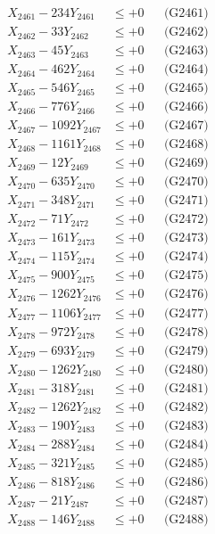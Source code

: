 \documentclass[a4paper,10pt]{article}
\begin{document}
{\begin{align}
\allowbreak
X_{2461} - 234Y_{2461} &\leq +0 && \text{(G2461)} \\
X_{2462} - 33Y_{2462} &\leq +0 && \text{(G2462)} \\
X_{2463} - 45Y_{2463} &\leq +0 && \text{(G2463)} \\
X_{2464} - 462Y_{2464} &\leq +0 && \text{(G2464)} \\
X_{2465} - 546Y_{2465} &\leq +0 && \text{(G2465)} \\
X_{2466} - 776Y_{2466} &\leq +0 && \text{(G2466)} \\
X_{2467} - 1092Y_{2467} &\leq +0 && \text{(G2467)} \\
X_{2468} - 1161Y_{2468} &\leq +0 && \text{(G2468)} \\
X_{2469} - 12Y_{2469} &\leq +0 && \text{(G2469)} \\
X_{2470} - 635Y_{2470} &\leq +0 && \text{(G2470)} \\
\allowbreak
X_{2471} - 348Y_{2471} &\leq +0 && \text{(G2471)} \\
X_{2472} - 71Y_{2472} &\leq +0 && \text{(G2472)} \\
X_{2473} - 161Y_{2473} &\leq +0 && \text{(G2473)} \\
X_{2474} - 115Y_{2474} &\leq +0 && \text{(G2474)} \\
X_{2475} - 900Y_{2475} &\leq +0 && \text{(G2475)} \\
X_{2476} - 1262Y_{2476} &\leq +0 && \text{(G2476)} \\
X_{2477} - 1106Y_{2477} &\leq +0 && \text{(G2477)} \\
X_{2478} - 972Y_{2478} &\leq +0 && \text{(G2478)} \\
X_{2479} - 693Y_{2479} &\leq +0 && \text{(G2479)} \\
X_{2480} - 1262Y_{2480} &\leq +0 && \text{(G2480)} \\
\allowbreak
X_{2481} - 318Y_{2481} &\leq +0 && \text{(G2481)} \\
X_{2482} - 1262Y_{2482} &\leq +0 && \text{(G2482)} \\
X_{2483} - 190Y_{2483} &\leq +0 && \text{(G2483)} \\
X_{2484} - 288Y_{2484} &\leq +0 && \text{(G2484)} \\
X_{2485} - 321Y_{2485} &\leq +0 && \text{(G2485)} \\
X_{2486} - 818Y_{2486} &\leq +0 && \text{(G2486)} \\
X_{2487} - 21Y_{2487} &\leq +0 && \text{(G2487)} \\
X_{2488} - 146Y_{2488} &\leq +0 && \text{(G2488)} \\

\end{align}}
\end{document}
